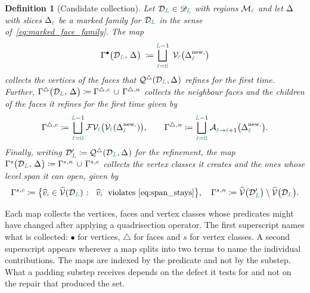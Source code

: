 \documentclass[a4paper, 12pt]{article}
\makeatletter
\newcommand{\quadriF}{\mathcal{Q}^{\triangle}}                   %
\newcommand{\collectV}{\Gamma^{\bullet}}                         %
\newcommand{\collectF}{\Gamma^{\triangle}}                       %
\newcommand{\collectC}{\Gamma^{s}}                               %
\newcommand{\green}{\color{ForestGreen}}
\newcommand{\brickred}{\color{BrickRed}}
\newcommand{\V}{\mathcal{V}}
\newcommand{\F}{\mathcal{F}}
\DeclareRobustCommand{\simplexsubsetTwo}[2][]{\Delta\ifx\@empty#1\@empty\else^{#1}\fi_{#2}}
\DeclareRobustCommand{\simplexsubsetNew}[2][]{\Delta^{\mathrm{new}\ifx\@empty#1\@empty\else,#1\fi}_{#2}}
\newcommand{\vertexClass}[1]{\widehat{v}_{#1}}
\newcommand{\vertexClasses}{\widehat{\V}}
\newcommand{\FVl}[1]{\F\V_{#1}}
\newcommand{\coarseIdxone}{{\brickred i}}
\renewcommand{\l}{{\green\ell}}
\renewcommand{\L}{{\green L}}
\newcommand{\lzero}{{\green 0}}
\newcommand{\Aop}[3]{\mathcal{A}^{#1}_{{#2} \to {#3}}}
\newcommand{\M}{\mathcal{M}}
\newtheorem{definition}[theorem]{Definition}
\theoremstyle{definition}
\theoremstyle{plain}
\numberwithin{equation}{section}
\DeclareRobustCommand{\domseq}[1][]{\mathcal{D}\ifx\@empty#1\@empty\else_{#1}\fi}
\newcommand{\alldomseqs}{\mathscr{D}}
\makeatother
\begin{document}
\begin{definition}[Candidate collection]
    \label{def:candidate_collection}
    Let $\domseq[\L] \in \alldomseqs_\L$ with regions $\M_\l$ and let $\simplexsubsetTwo{}$ with slices $\simplexsubsetTwo{\l}$ be a marked family for $\domseq[\L]$ in the sense of~\eqref{eq:marked_face_family}. The map
    \begin{equation}
        \label{eq:candidate_collection}
        \collectV \big( \domseq[\L], \, \simplexsubsetTwo{} \big) \; \coloneq \bigsqcup\limits_{\l = \lzero}^{\L-1} \; \V_\l \big( \simplexsubsetNew{\l} \big)
    \end{equation}
    collects the vertices of the faces that $\quadriF(\domseq[\L], \simplexsubsetTwo{})$ refines for the first time. Further, $\collectF \big( \domseq[\L], \, \simplexsubsetTwo{} \big) \coloneq \collectF{}^{,c} \, \cup \, \collectF{}^{,n}$ collects the neighbour faces and the children of the faces it refines for the first time given by
    \begin{equation}
        \label{eq:candidate_collection_faces}
        \collectF{}^{,c} \coloneq \bigsqcup\limits_{\l = \lzero}^{\L-1} \FVl{\l} \big( \V_\l ( \simplexsubsetNew{\l} ) \big), \qquad \collectF{}^{,n} \coloneq \bigsqcup\limits_{\l = \lzero}^{\L-1} \Aop{}{\l}{\l+1} \big( \simplexsubsetNew{\l} \big).
    \end{equation}
    Finally, writing $\domseq[\L]' \coloneq \quadriF(\domseq[\L], \simplexsubsetTwo{})$ for the refinement, the map $\collectC \big( \domseq[\L], \, \simplexsubsetTwo{} \big) \coloneq \collectC{}^{,n} \, \cup \, \collectC{}^{,c}$ collects the vertex classes it creates and the ones whose level span it can open, given by
    \begin{equation}
        \label{eq:class_candidate_terms}
        \collectC{}^{,c} \coloneq \big\{ \vertexClass{\coarseIdxone} \in \vertexClasses(\domseq[\L]) \; \colon \;\; \vertexClass{\coarseIdxone} \;\text{ violates}~\eqref{eq:span_stays} \big\}, \quad \collectC{}^{,n} \coloneq \vertexClasses \big( \domseq[\L]' \big) \setminus \vertexClasses \big( \domseq[\L] \big) .
    \end{equation}
\end{definition}

Each map collects the vertices, faces and vertex classes whose predicates might have changed after applying a quadrisection operator. The first superscript names what is collected: $\bullet$ for vertices, $\triangle$ for faces and $s$ for vertex classes. A second superscript appears wherever a map splits into two terms to name the individual contributions. The maps are indexed by the predicate and not by the substep. What a padding substep receives depends on the defect it tests for and not on the repair that produced the set.
\end{document}
